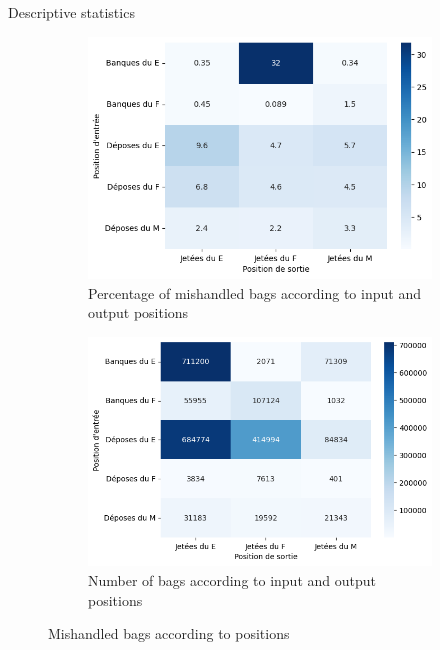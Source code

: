 \documentclass{beamer}
\begin{document}
\begin{frame}{Descriptive statistics} 
\begin{figure}[ht]
  \centering
  \begin{subfigure}{0.45\textwidth}
    \includegraphics[width=\linewidth]{percentage of failed per positions.png}
    \caption{Percentage of mishandled bags according to input and output positions}
    \label{fig:Percentage of mishandled bags according to input and output positions}
  \end{subfigure}
  \hfill
  \begin{subfigure}{0.48\textwidth}
    \includegraphics[width=\linewidth]{number of bags per positions.png}
    \caption{Number of bags according to input and output positions}
    \label{fig:Number of bags according to input and output positions}
  \end{subfigure}
  \caption{Mishandled bags according to positions}
  \label{fig:Mishandled bags according to positions}
\end{figure}
\end{frame}
\end{document}
